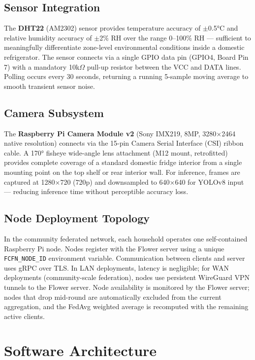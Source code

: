\documentclass[12pt,a4paper]{report}
\begin{document}
\subsection{Sensor Integration}
The \textbf{DHT22} (AM2302) sensor provides temperature accuracy of $\pm$0.5°C and relative humidity accuracy of $\pm$2\% RH over the range 0--100\% RH — sufficient to meaningfully differentiate zone-level environmental conditions inside a domestic refrigerator. The sensor connects via a single GPIO data pin (GPIO4, Board Pin 7) with a mandatory 10k$\Omega$ pull-up resistor between the VCC and DATA lines. Polling occurs every 30 seconds, returning a running 5-sample moving average to smooth transient sensor noise.

\subsection{Camera Subsystem}
The \textbf{Raspberry Pi Camera Module v2} (Sony IMX219, 8MP, 3280×2464 native resolution) connects via the 15-pin Camera Serial Interface (CSI) ribbon cable. A 170° fisheye wide-angle lens attachment (M12 mount, retrofitted) provides complete coverage of a standard domestic fridge interior from a single mounting point on the top shelf or rear interior wall. For inference, frames are captured at 1280×720 (720p) and downsampled to 640×640 for YOLOv8 input — reducing inference time without perceptible accuracy loss.

\subsection{Node Deployment Topology}
In the community federated network, each household operates one self-contained Raspberry Pi node. Nodes register with the Flower server using a unique \texttt{FCFN\_NODE\_ID} environment variable. Communication between clients and server uses gRPC over TLS. In LAN deployments, latency is negligible; for WAN deployments (community-scale federation), nodes use persistent WireGuard VPN tunnels to the Flower server. Node availability is monitored by the Flower server; nodes that drop mid-round are automatically excluded from the current aggregation, and the FedAvg weighted average is recomputed with the remaining active clients.

\section{Software Architecture}
\end{document}
